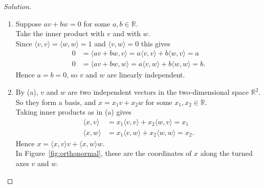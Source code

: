\documentclass[11pt,a4paper]{article}
\theoremstyle{boxed}
\theoremstyle{definition}
\newenvironment{solution}{\begin{proof}[Solution]}{\end{proof}}
\newenvironment{plate}{\par\medskip\noindent\begin{minipage}{\linewidth}\centering}{\end{minipage}\par\medskip}
\newcommand{\R}{\mathbb{R}}
\newcommand{\ip}[2]{\langle #1, #2 \rangle}
\begin{document}
\begin{solution}
\leavevmode
\begin{enumerate}
    \item Suppose $av+bw=0$ for some $a,b\in\R$.\\
    Take the inner product with $v$ and with $w$.\\
    Since $\ip{v}{v}=\ip{w}{w}=1$ and $\ip{v}{w}=0$ this gives
    \begin{align*}
    0 &= \ip{av+bw}{v}=a\ip{v}{v}+b\ip{w}{v}=a\\
    0 &= \ip{av+bw}{w}=a\ip{v}{w}+b\ip{w}{w}=b.
    \end{align*}
    Hence $a=b=0$, so $v$ and $w$ are linearly independent.
    \item By (a), $v$ and $w$ are two independent vectors in the two-dimensional space $\R^2$.\\
    So they form a basis, and $x=x_1v+x_2w$ for some $x_1,x_2\in\R$.\\
    Taking inner products as in (a) gives
    \begin{align*}
    \ip{x}{v} &= x_1\ip{v}{v}+x_2\ip{w}{v}=x_1\\
    \ip{x}{w} &= x_1\ip{v}{w}+x_2\ip{w}{w}=x_2.
    \end{align*}
    Hence $x=\ip{x}{v}v+\ip{x}{w}w$.\\
    In Figure~\ref{fig:orthonormal}, these are the coordinates of $x$ along the turned axes $v$ and $w$. \qedhere
\end{enumerate}
\end{solution}

\begin{plate}
\label{fig:orthonormal}
\end{plate}
\end{document}
